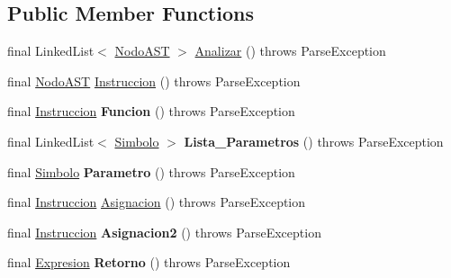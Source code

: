 \subsection*{Public Member Functions}
\begin{DoxyCompactItemize}
\item 
final Linked\+List$<$ \mbox{\hyperlink{interfaceast_1_1_nodo_a_s_t}{Nodo\+A\+ST}} $>$ \mbox{\hyperlink{classanalizadores_1_1_gramatica_a52ca5cd50acfbaffac4e463c71e8b7d0}{Analizar}} ()  throws Parse\+Exception 
\item 
final \mbox{\hyperlink{interfaceast_1_1_nodo_a_s_t}{Nodo\+A\+ST}} \mbox{\hyperlink{classanalizadores_1_1_gramatica_a9e84c347a44af8ef31e238a877e52eda}{Instruccion}} ()  throws Parse\+Exception 
\item 
\mbox{\label{classanalizadores_1_1_gramatica_a10aec7ef38fd1abe23b6f07920e83541}} 
final \mbox{\hyperlink{interfaceast_1_1_instruccion}{Instruccion}} {\bfseries Funcion} ()  throws Parse\+Exception 
\item 
\mbox{\label{classanalizadores_1_1_gramatica_aa0966b242f463d11350f4ca5962d84ed}} 
final Linked\+List$<$ \mbox{\hyperlink{classentorno_1_1_simbolo}{Simbolo}} $>$ {\bfseries Lista\+\_\+\+Parametros} ()  throws Parse\+Exception 
\item 
\mbox{\label{classanalizadores_1_1_gramatica_a2011491b79ad1d1ed63c2c6db45d7f14}} 
final \mbox{\hyperlink{classentorno_1_1_simbolo}{Simbolo}} {\bfseries Parametro} ()  throws Parse\+Exception 
\item 
final \mbox{\hyperlink{interfaceast_1_1_instruccion}{Instruccion}} \mbox{\hyperlink{classanalizadores_1_1_gramatica_a6ef9e58d753e27519e70a5f5085eb13b}{Asignacion}} ()  throws Parse\+Exception 
\item 
\mbox{\label{classanalizadores_1_1_gramatica_a9e71d0f07af7ac12f5799832174a4dd4}} 
final \mbox{\hyperlink{interfaceast_1_1_instruccion}{Instruccion}} {\bfseries Asignacion2} ()  throws Parse\+Exception 
\item 
\mbox{\label{classanalizadores_1_1_gramatica_a8491b008d889445c8f9b170c3f4dd522}} 
final \mbox{\hyperlink{interfaceast_1_1_expresion}{Expresion}} {\bfseries Retorno} ()  throws Parse\+Exception 

\end{DoxyCompactItemize}
